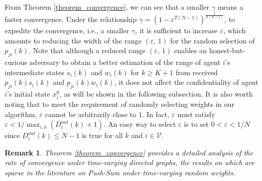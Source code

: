 \documentclass{IEEEtran}
\newtheorem{Remark}{Remark}
\begin{document}
From Theorem \ref{theorem_convergence}, we can see that a smaller $\gamma$ means a faster convergence. Under the relationship $\gamma= (1-\varepsilon^{T(N-1)}) ^{\frac{1}{T(N-1)}}$, to expedite the convergence, i.e., a smaller $\gamma$, it is sufficient to increase $\varepsilon$, which amounts to reducing the width of the range $(\varepsilon, \, 1)$ for the random selection of $p_{ji}(k)$. Note that although a reduced range $(\varepsilon, \, 1)$ enables an honest-but-curious adversary to obtain a better estimation of the range of agent $i$'s intermediate states $s_i(k)$ and $w_i(k)$ for $k \geq K+1$ from received $p_{ji}(k)s_i(k)$ and $p_{ji}(k)w_i(k)$, it does not affect the confidentiality of agent $i$'s initial state $x_i^0$, as will be shown in the following subsection. It is also worth noting that to meet the requirement of randomly selecting weights in our algorithm, $\varepsilon$ cannot be arbitrarily close to $1$. In fact, $\varepsilon$ must satisfy $\varepsilon < 1/\max_{i,k}({D_i^{out}(k)}+1)$. An easy way to select $\varepsilon$ is to set $0<\varepsilon<1/N$ since $D_i^{out}(k) \leq N-1$ is true for all $k$ and $i \in \mathcal{V}$.

\begin{Remark}\label{remark_time_varying_convergence}
	Theorem \ref{theorem_convergence} provides a detailed analysis of the rate of convergence under time-varying directed graphs, the results on which are sparse in the literature on Push-Sum under time-varying random weights.
\end{Remark}
\end{document}
